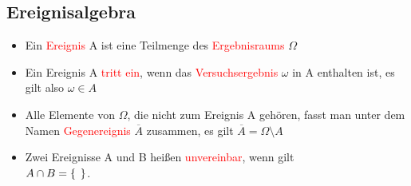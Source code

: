 \subsection{Ereignisalgebra}
\begin{itemize}
    \item Ein \textcolor{red}{Ereignis} A ist eine Teilmenge des \textcolor{red}{Ergebnisraums} $\Omega$
    \item Ein Ereignis A \textcolor{red}{tritt ein}, wenn das \textcolor{red}{Versuchsergebnis} $\omega$ in A enthalten ist, es gilt also $\omega \in A$
    \item Alle Elemente von $\Omega$, die nicht zum Ereignis A gehören, fasst man unter dem Namen \textcolor{red}{Gegenereignis} $\overline{A}$ zusammen, es gilt $\overline{A}= \Omega\setminus A$
    \item Zwei Ereignisse A und B heißen \textcolor{red}{unvereinbar}, wenn gilt \\$A \cap B = \{ \hspace{0.15cm}\}$.
\end{itemize}
